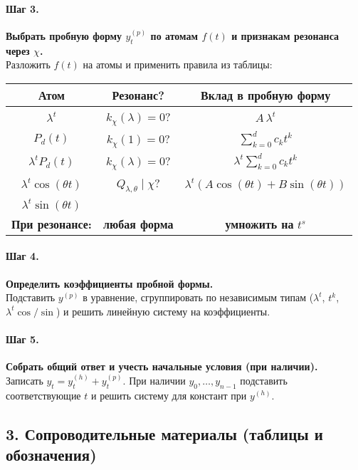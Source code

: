 \paragraph{Шаг 3.} \textbf{Выбрать пробную форму \(y^{(p)}_t\) по атомам \(f(t)\) и признакам резонанса через \(\chi\).}\\
Разложить \(f(t)\) на атомы и применить правила из таблицы:

\begin{center}
\begin{tabular}{|c|c|c|}
\hline
\textbf{Атом} & \textbf{Резонанс?} & \textbf{Вклад в пробную форму} \\
\hline
\(\lambda^{t}\) & \(k_\chi(\lambda) = 0\)? & \(A\,\lambda^{t}\) \\
\hline
\(P_d(t)\) & \(k_\chi(1) = 0\)? & \(\sum_{k=0}^d c_k t^k\) \\
\hline
\(\lambda^{t}P_d(t)\) & \(k_\chi(\lambda) = 0\)? & \(\lambda^{t}\sum_{k=0}^d c_k t^k\) \\
\hline
\(\lambda^{t}\cos(\theta t)\) & \(Q_{\lambda,\theta} \mid \chi\)? & \(\lambda^{t}(A\cos(\theta t)+B\sin(\theta t))\) \\
\(\lambda^{t}\sin(\theta t)\) & & \\
\hline
\textbf{При резонансе:} & \textbf{любая форма} & \textbf{умножить на } \(t^{s}\) \\
\hline
\end{tabular}
\end{center}

\paragraph{Шаг 4.} \textbf{Определить коэффициенты пробной формы.}\\
Подставить \(y^{(p)}\) в уравнение, сгруппировать по независимым типам (\(\lambda^t\), \(t^k\), \(\lambda^t\cos/\sin\)) и решить линейную систему на коэффициенты.

\paragraph{Шаг 5.} \textbf{Собрать общий ответ и учесть начальные условия (при наличии).}\\
Записать \(y_t=y^{(h)}_t+y^{(p)}_t\). При наличии \(y_0,\dots,y_{n-1}\) подставить соответствующие \(t\) и решить систему для констант при \(y^{(h)}\).

\subsection*{3. Сопроводительные материалы (таблицы и обозначения)}

